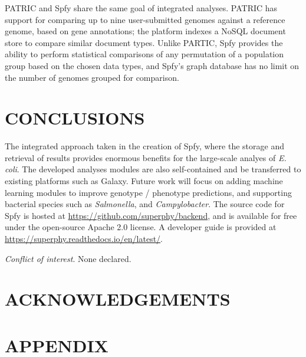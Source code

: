 \documentclass{article}
\begin{document}
\small 

PATRIC \cite{wattam2016improvements} and Spfy share the same goal of integrated analyses. PATRIC has support for comparing up to nine user-submitted genomes against a reference genome, based on gene annotations; the platform indexes a NoSQL document store to compare similar document types. Unlike PARTIC, Spfy provides the ability to perform statistical comparisons of any permutation of a population group based on the chosen data types, and Spfy's graph database has no limit on the number of genomes grouped for comparison.

\section{CONCLUSIONS}

The integrated approach taken in the creation of Spfy, where the storage and retrieval of results provides enormous benefits for the large-scale analyes of \textit{E. coli}. The developed analyses modules are also self-contained and be transferred to existing platforms such as Galaxy. Future work will focus on adding machine learning modules to improve genotype / phenotype predictions, and supporting bacterial species such as \textit{Salmonella}, and \textit{Campylobacter}. The source code for Spfy is hosted at \url{https://github.com/superphy/backend}, and is available for free under the open-source Apache 2.0 license. A developer guide is provided at \url{https://superphy.readthedocs.io/en/latest/}.

\textit{Conflict of interest}. None declared.

\section{ACKNOWLEDGEMENTS}

\newpage




\newpage

\section{APPENDIX}
\end{document}
